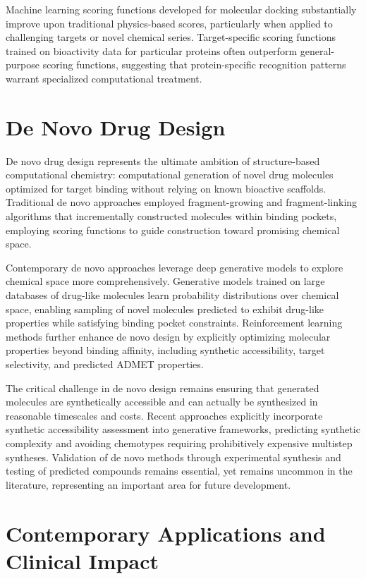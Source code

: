 \documentclass[12pt,a4paper]{article}
\begin{document}
Machine learning scoring functions developed for molecular docking substantially improve upon traditional physics-based scores, particularly when applied to challenging targets or novel chemical series. Target-specific scoring functions trained on bioactivity data for particular proteins often outperform general-purpose scoring functions, suggesting that protein-specific recognition patterns warrant specialized computational treatment.

\section*{De Novo Drug Design}

De novo drug design represents the ultimate ambition of structure-based computational chemistry: computational generation of novel drug molecules optimized for target binding without relying on known bioactive scaffolds. Traditional de novo approaches employed fragment-growing and fragment-linking algorithms that incrementally constructed molecules within binding pockets, employing scoring functions to guide construction toward promising chemical space.

Contemporary de novo approaches leverage deep generative models to explore chemical space more comprehensively. Generative models trained on large databases of drug-like molecules learn probability distributions over chemical space, enabling sampling of novel molecules predicted to exhibit drug-like properties while satisfying binding pocket constraints. Reinforcement learning methods further enhance de novo design by explicitly optimizing molecular properties beyond binding affinity, including synthetic accessibility, target selectivity, and predicted ADMET properties.

The critical challenge in de novo design remains ensuring that generated molecules are synthetically accessible and can actually be synthesized in reasonable timescales and costs. Recent approaches explicitly incorporate synthetic accessibility assessment into generative frameworks, predicting synthetic complexity and avoiding chemotypes requiring prohibitively expensive multistep syntheses. Validation of de novo methods through experimental synthesis and testing of predicted compounds remains essential, yet remains uncommon in the literature, representing an important area for future development.

\section*{Contemporary Applications and Clinical Impact}
\end{document}
